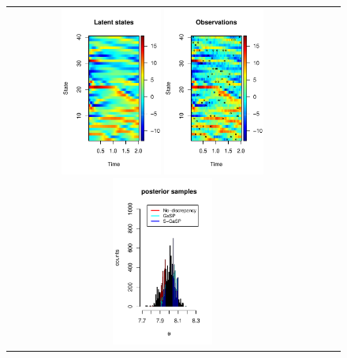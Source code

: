   

  \begin{figure}[t]
\centering
  \begin{tabular}{ccc}

	\hspace{-.1in} \includegraphics[height=0.5\textwidth,width=0.33\textwidth]{figures/Lorenz_96_reality_with_discrepancy.pdf}
	\hspace{-.1in} \includegraphics[height=0.5\textwidth,width=0.33\textwidth]{figures/Lorenz_96_obs_with_discrepancy.pdf}
		\hspace{-.1in} \includegraphics[height=0.5\textwidth,width=0.33\textwidth]{figures/sample_theta_Lorenz_96_with_discrepancy.pdf} \vspace{-.3in} \\

\end{tabular}
\end{figure}
